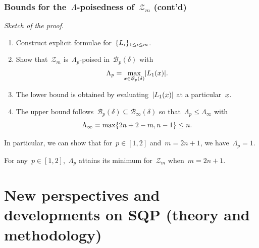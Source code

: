 \documentclass{polyu-presentation}
\newcommand{\iter}[1][]{x\ifthenelse{\equal{#1}{}}{}{^{#1}}}
\newcommand{\lagp}[1][]{L\ifthenelse{\equal{#1}{}}{}{_{#1}}}
\begin{document}
\begin{frame}
    \frametitle{Bounds for the~$\Lambda$-poisedness of~$\mathcal{Z}_m$ (cont'd)}

    \emph{Sketch of the proof}.
    \begin{enumerate}
        \item Construct explicit formulae for~$\set{\lagp[i]}_{1 \le i \le m}$.
        \item Show that~$\mathcal{Z}_m$ is~$\Lambda_p$-poised in~$\mathcal{B}_p(\delta)$ with
        \begin{equation*}
            \Lambda_p = \max_{\iter \in \mathcal{B}_p(\delta)} \abs{\lagp[1](\iter)}.
        \end{equation*}
        \item The lower bound is obtained by evaluating~$\abs{\lagp[1](\iter)}$ at a particular~$\iter$.
        \item The upper bound follows~$\mathcal{B}_p(\delta) \subseteq \mathcal{B}_{\infty}(\delta)$ so that~$\Lambda_p \le \Lambda_{\infty}$ with
        \begin{equation*}
            \Lambda_{\infty} = \max \{2n + 2 - m, n - 1\} \le n.
        \end{equation*}
    \end{enumerate}

    \medskip

    In particular, we can show that for~$p \in [1, 2]$ and~$m = 2n + 1$, we have~$\Lambda_p = 1$.

    \medskip

    \begin{block}{}
        For any~$p \in [1, 2]$,~$\Lambda_p$ attains its \alert{minimum} for~$\mathcal{Z}_m$ when~$m = 2n + 1$.
    \end{block}
\end{frame}

\section{New perspectives and developments on SQP (\textbf{theory} and \textbf{methodology})}
\end{document}
